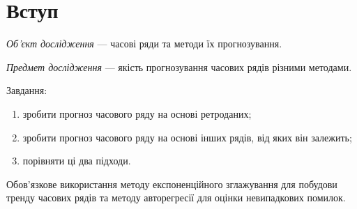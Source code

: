 \chapter*{Вступ}

\textit{Об’єкт дослідження} --- часові ряди та методи їх прогнозування.

\textit{Предмет дослідження} --- якість прогнозування часових рядів
різними методами.

Завдання:
\begin{enumerate}
  \item
    зробити прогноз часового ряду на основі ретроданих;
  \item
    зробити прогноз часового ряду на основі інших рядів,
    від яких він залежить;
  \item
    порівняти ці два підходи.
\end{enumerate}
Обов'язкове використання методу експоненційного зглажування
для побудови тренду часових рядів
та методу авторегресії для оцінки невипадкових помилок.
